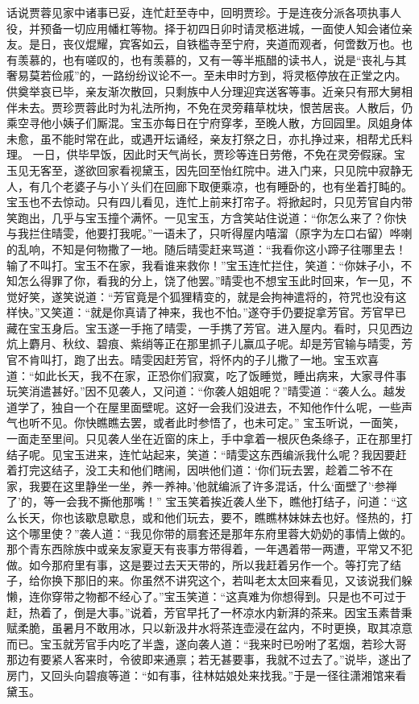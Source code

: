 \documentclass[12pt,oneside]{book}
\begin{document}
话说贾蓉见家中诸事已妥，连忙赶至寺中，回明贾珍。于是连夜分派各项执事人役，并预备一切应用幡杠等物。择于初四日卯时请灵柩进城，一面使人知会诸位亲友。是日，丧仪焜耀，宾客如云，自铁槛寺至宁府，夹道而观者，何啻数万也。也有羡慕的，也有嗟叹的，也有羡慕的，又有一等半瓶醋的读书人，说是“丧礼与其奢易莫若俭戚”的，一路纷纷议论不一。至未申时方到，将灵柩停放在正堂之内。供奠举哀已毕，亲友渐次散回，只剩族中人分理迎宾送客等事。近亲只有邢大舅相伴未去。贾珍贾蓉此时为礼法所拘，不免在灵旁藉草枕块，恨苦居丧。人散后，仍乘空寻他小姨子们厮混。宝玉亦每日在宁府穿孝，至晚人散，方回园里。凤姐身体未愈，虽不能时常在此，或遇开坛诵经，亲友打祭之日，亦扎挣过来，相帮尤氏料理。
一日，供毕早饭，因此时天气尚长，贾珍等连日劳倦，不免在灵旁假寐。宝玉见无客至，遂欲回家看视黛玉，因先回至怡红院中。进入门来，只见院中寂静无人，有几个老婆子与小丫头们在回廊下取便乘凉，也有睡卧的，也有坐着打盹的。宝玉也不去惊动。只有四儿看见，连忙上前来打帘子。将掀起时，只见芳官自内带笑跑出，几乎与宝玉撞个满怀。一见宝玉，方含笑站住说道：“你怎么来了？你快与我拦住晴雯，他要打我呢。”一语未了，只听得屋内嘻溜（原字为左口右留）哗喇的乱响，不知是何物撒了一地。随后晴雯赶来骂道：“我看你这小蹄子往哪里去！输了不叫打。宝玉不在家，我看谁来救你！”宝玉连忙拦住，笑道：“你妹子小，不知怎么得罪了你，看我的分上，饶了他罢。”晴雯也不想宝玉此时回来，乍一见，不觉好笑，遂笑说道：“芳官竟是个狐狸精变的，就是会拘神遣将的，符咒也没有这样快。”又笑道：“就是你真请了神来，我也不怕。”遂夺手仍要捉拿芳官。芳官早已藏在宝玉身后。宝玉遂一手拖了晴雯，一手携了芳官。进入屋内。看时，只见西边炕上麝月、秋纹、碧痕、紫绡等正在那里抓子儿赢瓜子呢。却是芳官输与晴雯，芳官不肯叫打，跑了出去。晴雯因赶芳官，将怀内的子儿撒了一地。宝玉欢喜道：“如此长天，我不在家，正恐你们寂寞，吃了饭睡觉，睡出病来，大家寻件事玩笑消遣甚好。”因不见袭人，又问道：“你袭人姐姐呢？”晴雯道︰“袭人么。越发道学了，独自一个在屋里面壁呢。这好一会我们没进去，不知他作什么呢，一些声气也听不见。你快瞧瞧去罢，或者此时参悟了，也未可定。”
宝玉听说，一面笑，一面走至里间。只见袭人坐在近窗的床上，手中拿着一根灰色条绦子，正在那里打结子呢。见宝玉进来，连忙站起来，笑道：“晴雯这东西编派我什么呢？我因要赶着打完这结子，没工夫和他们瞎闹，因哄他们道：‘你们玩去罢，趁着二爷不在家，我要在这里静坐一坐，养一养神。’他就编派了许多混话，什么‘面壁了’‘参禅了’的，等一会我不撕他那嘴！”
宝玉笑着挨近袭人坐下，瞧他打结子，问道：“这么长天，你也该歇息歇息，或和他们玩去，要不，瞧瞧林妹妹去也好。怪热的，打这个哪里使？”袭人道：“我见你带的扇套还是那年东府里蓉大奶奶的事情上做的。那个青东西除族中或亲友家夏天有丧事方带得着，一年遇着带一两遭，平常又不犯做。如今那府里有事，这是要过去天天带的，所以我赶着另作一个。等打完了结子，给你换下那旧的来。你虽然不讲究这个，若叫老太太回来看见，又该说我们躲懒，连你穿带之物都不经心了。”宝玉笑道：“这真难为你想得到。只是也不可过于赶，热着了，倒是大事。”说着，芳官早托了一杯凉水内新湃的茶来。因宝玉素昔秉赋柔脆，虽暑月不敢用冰，只以新汲井水将茶连壶浸在盆内，不时更换，取其凉意而已。宝玉就芳官手内吃了半盏，遂向袭人道：“我来时已吩咐了茗烟，若珍大哥那边有要紧人客来时，令彼即来通禀；若无甚要事，我就不过去了。”说毕，遂出了房门，又回头向碧痕等道：“如有事，往林姑娘处来找我。”于是一径往潇湘馆来看黛玉。
\end{document}
